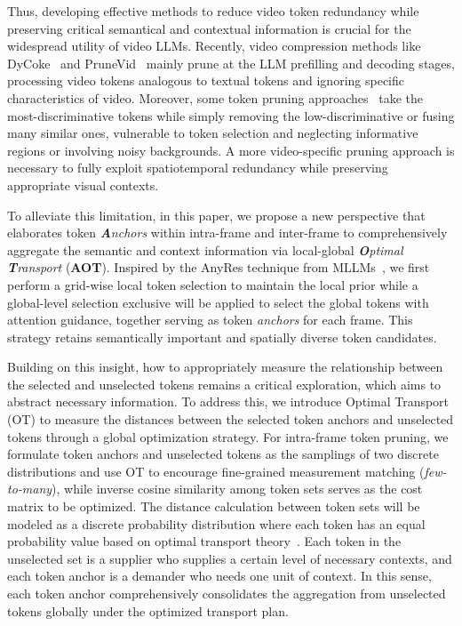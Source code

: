 Thus, developing effective methods to reduce video token redundancy while preserving critical semantical and contextual information is crucial for the widespread utility of video LLMs. Recently, video compression methods like DyCoke~\cite{tao2025dycoke} and PruneVid~\cite{huang2024prunevid} mainly prune at the LLM prefilling and decoding stages, processing video tokens analogous to textual tokens and ignoring specific characteristics of video. Moreover, some token pruning approaches~\cite{fu2024framefusion,bolya2022token,yang2025visionzip,shang2025llava} take the most-discriminative tokens while simply removing the low-discriminative or fusing many similar ones, vulnerable to token selection and neglecting informative regions or involving noisy backgrounds. A more video-specific pruning approach is necessary to fully exploit spatiotemporal redundancy while preserving appropriate visual contexts.



To alleviate this limitation, in this paper, we propose a new perspective that elaborates token \textit{\textbf{A}nchors} within intra-frame and inter-frame to comprehensively aggregate the semantic and context information via local-global \textit{\textbf{O}ptimal} \textit{\textbf{T}ransport} (\textbf{AOT}). Inspired by the AnyRes technique from MLLMs~\cite{li2024llava,chen2024far,zhang2024llavanextvideo}, we first perform a grid-wise local token selection to maintain the local prior while a global-level selection exclusive will be applied to select the global tokens with attention guidance, together serving as token \textit{anchors} for each frame. This strategy retains semantically important and spatially diverse token candidates.



Building on this insight, how to appropriately measure the relationship between the selected and unselected tokens remains a critical exploration, which aims to abstract necessary information. To address this, we introduce Optimal Transport (OT) to measure the distances between the selected token anchors and unselected tokens through a global optimization strategy. For intra-frame token pruning, we formulate token anchors and unselected tokens as the samplings of two discrete distributions and use OT to encourage fine-grained measurement matching (\textit{few-to-many}), while inverse cosine similarity among token sets serves as the cost matrix to be optimized. 
%
The distance calculation between token sets will be modeled as a discrete probability distribution where each token has an equal probability value based on optimal transport theory~\cite{villani2008optimal}.
Each token in the unselected set is a supplier who supplies a certain level of necessary contexts, and each token anchor is a demander who needs one unit of context. 
In this sense, each token anchor comprehensively consolidates the aggregation from unselected tokens globally under the optimized transport plan.




